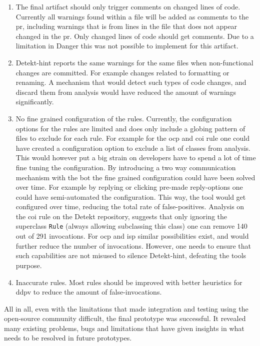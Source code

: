 \documentclass[pdftex,10pt,b5paper,twoside]{report}
\begin{document}
\begin{enumerate}

    \item The final artifact should only trigger comments on changed lines of code. Currently all warnings found within a file will be added as comments to the \gls{pr}, including warnings that is from lines in the file that does not appear changed in the \gls{pr}. Only changed lines of code should get comments. Due to a limitation in Danger this was not possible to implement for this artifact.
    
    \item Detekt-hint reports the same warnings for the same files when non-functional changes are committed. For example changes related to formatting or renaming. A mechanism that would detect such types of code changes, and discard them from analysis would have reduced the amount of warnings significantly.
    
    \item No fine grained configuration of the rules. Currently, the configuration options for the rules are limited and does only include a globing pattern of files to exclude for each rule. For example for the \gls{ocp} and \gls{coi} rule one could have created a configuration option to exclude a list of classes from analysis. This would however put a big strain on developers have to spend a lot of time fine tuning the configuration. By introducing a two way communication mechanism with the bot the fine grained configuration could have been solved over time. For example by replying or clicking pre-made reply-options one could have semi-automated the configuration. This way, the tool would get configured over time, reducing the total rate of false-positives. Analysis on the \gls{coi} rule on the Detekt repository, suggests that only ignoring the superclass \texttt{Rule} (always allowing subclassing this class) one can remove 140 out of 291 invocations. For \gls{ocp} and \gls{isp} similar possibilities exist, and would further reduce the number of invocations. However, one needs to ensure that such capabilities are not misused to silence Detekt-hint, defeating the tools purpose.
    
    \item Inaccurate rules. Most rules should be improved with better heuristics for \gls{ddpv} to reduce the amount of false-invocations.
   
\end{enumerate}

All in all, even with the limitations that made integration and testing using the open-source community difficult, the final prototype was successful. It revealed many existing problems, bugs and limitations that have given insights in what needs to be resolved in future prototypes. 
\end{document}
